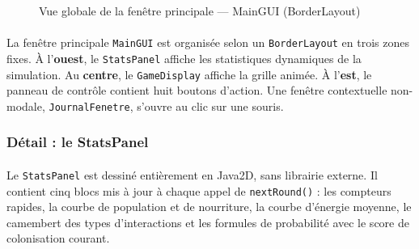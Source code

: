 \begin{figure}[h!]
\begin{center}
\end{center}
\caption{Vue globale de la fenêtre principale --- MainGUI (BorderLayout)}
\label{fig:ihm_global}
\end{figure}

\paragraph{} La fenêtre principale \texttt{MainGUI} est organisée selon un \texttt{BorderLayout} en trois zones fixes. À l'\textbf{ouest}, le \texttt{StatsPanel} affiche les statistiques dynamiques de la simulation. Au \textbf{centre}, le \texttt{GameDisplay} affiche la grille animée. À l'\textbf{est}, le panneau de contrôle contient huit boutons d'action. Une fenêtre contextuelle non-modale, \texttt{JournalFenetre}, s'ouvre au clic sur une souris.

\subsubsection{Détail : le StatsPanel}

\paragraph{} Le \texttt{StatsPanel} est dessiné entièrement en Java2D, sans librairie externe. Il contient cinq blocs mis à jour à chaque appel de \texttt{nextRound()} : les compteurs rapides, la courbe de population et de nourriture, la courbe d'énergie moyenne, le camembert des types d'interactions et les formules de probabilité avec le score de colonisation courant.

